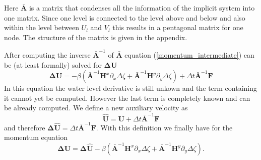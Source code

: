 \documentclass[12pt,draft]{article}
\newcommand{\Unod}{U}
\newcommand{\Vnod}{V}
\newcommand{\zdel}{\Delta \zeta}
\newcommand{\UV}{\mathbf{U}}
\newcommand{\UVdel}{\mathbf{\Delta U}}
\newcommand{\UVhat}{\hat{\mathbf{U}}}
\newcommand{\UVhatdel}{\mathbf{\Delta \hat{U}}}
\newcommand{\HH}{\mathbf{H}}
\newcommand{\Amat}{\mathbf{\bar{A}}}
\newcommand{\AmatI}{\mathbf{\bar{A}}^{-1}}
\newcommand{\FF}{\mathbf{F}}
\newcommand{\dt}{\Delta t}
\newcommand{\delx}{\partial_x}
\newcommand{\dely}{\partial_y}
\begin{document}
Here $\Amat$ is a matrix that condenses all the information of
the implicit system into one matrix. Since one level is connected
to the level above and below and also within the level between 
$\Unod_l$ and $\Vnod_l$ this results in a pentagonal matrix
for one node. The structure of the matrix is given in the appendix.

After computing the inverse $\AmatI$ of $\Amat$ equation
(\ref{momentum_intermediate})
can be (at least formally) solved for $\UVdel$
\begin{equation}
	\UVdel =
		- \beta(\AmatI\HH^x\delx\zdel+\AmatI\HH^y\dely\zdel)
		+ \dt\AmatI\FF 
\end{equation}
In this equation the water level derivative is still unkown and
the term containing it
cannot yet be computed. However the last term is completely
known and can be already 
computed. We define a new auxiliary velocity as
\begin{equation}
	\label{uv_hat}
	\UVhat = \UV + \dt\AmatI\FF
\end{equation}
and therefore
$\UVhatdel = \dt\AmatI\FF$. With this definition we finally have
for the momentum equation
\begin{equation}
	\label{momentum_final}
	\UVdel = \UVhatdel
		- \beta 
		\left(
		\AmatI\HH^x\delx\zdel+\AmatI\HH^y\dely\zdel
		\right).
\end{equation}
\end{document}

